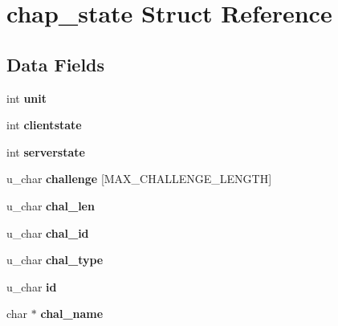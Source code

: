 \hypertarget{structchap__state}{}\section{chap\+\_\+state Struct Reference}
\label{structchap__state}
\subsection*{Data Fields}
\begin{DoxyCompactItemize}
\item 
\mbox{\label{structchap__state_a01ffde483a24c28432ff85f5bd2199c9}} 
int {\bfseries unit}
\item 
\mbox{\label{structchap__state_a575cfd919a0e27c5e54d925aebf8072b}} 
int {\bfseries clientstate}
\item 
\mbox{\label{structchap__state_a679bd23256cec82b05f8331ad7daa7df}} 
int {\bfseries serverstate}
\item 
\mbox{\label{structchap__state_ae75ec6f82ce119c1e97dd02bd5ee96df}} 
u\+\_\+char {\bfseries challenge} \mbox{[}M\+A\+X\+\_\+\+C\+H\+A\+L\+L\+E\+N\+G\+E\+\_\+\+L\+E\+N\+G\+TH\mbox{]}
\item 
\mbox{\label{structchap__state_a7668afc28040ada978fb22db0d34f248}} 
u\+\_\+char {\bfseries chal\+\_\+len}
\item 
\mbox{\label{structchap__state_af73bc4d37575b9405353f3d00d2227d3}} 
u\+\_\+char {\bfseries chal\+\_\+id}
\item 
\mbox{\label{structchap__state_a40332b711b680d3fe127d9855d230abb}} 
u\+\_\+char {\bfseries chal\+\_\+type}
\item 
\mbox{\label{structchap__state_a8d8751b4f12637227ebddb2db53f1a71}} 
u\+\_\+char {\bfseries id}
\item 
\mbox{\label{structchap__state_a43f27cb4de836c37823620b601286faa}} 
char $\ast$ {\bfseries chal\+\_\+name}
\item 
\mbox{\label{structchap__state_a66731424e3bc0790aad06797741b004f}} 

\end{DoxyCompactItemize}
